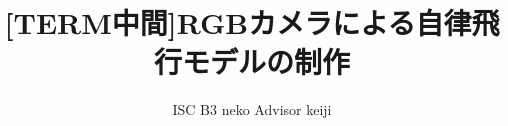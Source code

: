 \documentclass[uplatex,a4j,10pt]{jsarticle}
\begin{document}

\title{[TERM中間]RGBカメラによる自律飛行モデルの制作}

\author{
    ISC B3 {neko}
    Advisor {keiji}
}

 

\maketitle
\thispagestyle{empty}







\end{document}
